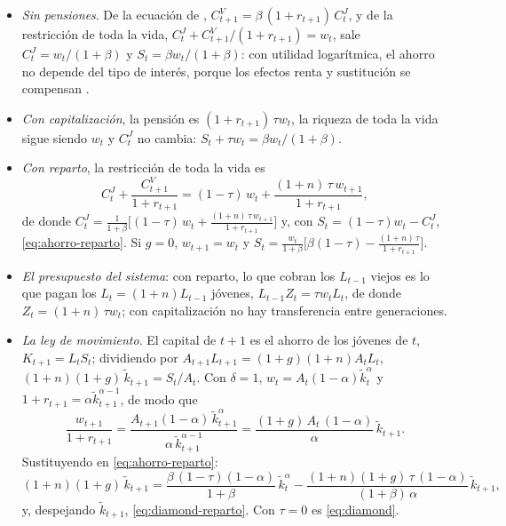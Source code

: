 \documentclass[11pt]{article}
\begin{document}
\begin{itemize}
\item \emph{Sin pensiones}. De la ecuación de , $C^V_{t+1}=\beta\,(1+r_{t+1})\,C^J_t$, y de la restricción de toda la vida, $C^J_t+C^V_{t+1}/(1+r_{t+1})=w_t$, sale $C^J_t=w_t/(1+\beta)$ y $S_t=\beta w_t/(1+\beta)$: con utilidad logarítmica, el ahorro no depende del tipo de interés, porque los efectos renta y sustitución se compensan .
\item \emph{Con capitalización}, la pensión es $(1+r_{t+1})\,\tau w_t$, la riqueza de toda la vida sigue siendo $w_t$ y $C^J_t$ no cambia: $S_t+\tau w_t=\beta w_t/(1+\beta)$.
\item \emph{Con reparto}, la restricción de toda la vida es
  \begin{equation*}
  C^J_t+\frac{C^V_{t+1}}{1+r_{t+1}}=(1-\tau)\,w_t+\frac{(1+n)\,\tau\,w_{t+1}}{1+r_{t+1}},
  \end{equation*}
  de donde $C^J_t=\frac{1}{1+\beta}\Big[(1-\tau)\,w_t+\frac{(1+n)\,\tau\,w_{t+1}}{1+r_{t+1}}\Big]$ y, con $S_t=(1-\tau)w_t-C^J_t$, \eqref{eq:ahorro-reparto}. Si $g=0$, $w_{t+1}=w_t$ y $S_t=\frac{w_t}{1+\beta}\Big[\beta(1-\tau)-\frac{(1+n)\,\tau}{1+r_{t+1}}\Big]$.
\item \emph{El presupuesto del sistema}: con reparto, lo que cobran los $L_{t-1}$ viejos es lo que pagan los $L_t=(1+n)L_{t-1}$ jóvenes, $L_{t-1}Z_t=\tau w_tL_t$, de donde $Z_t=(1+n)\,\tau w_t$; con capitalización no hay transferencia entre generaciones.
\item \emph{La ley de movimiento}. El capital de $t+1$ es el ahorro de los jóvenes de $t$, $K_{t+1}=L_tS_t$; dividiendo por $A_{t+1}L_{t+1}=(1+g)(1+n)A_tL_t$, $(1+n)(1+g)\,\tilde k_{t+1}=S_t/A_t$. Con $\delta=1$, $w_t=A_t(1-\alpha)\tilde k_t^{\alpha}$ y $1+r_{t+1}=\alpha \tilde k_{t+1}^{\alpha-1}$, de modo que
  \begin{equation*}
  \frac{w_{t+1}}{1+r_{t+1}}=\frac{A_{t+1}(1-\alpha)\,\tilde k_{t+1}^{\alpha}}{\alpha\,\tilde k_{t+1}^{\alpha-1}}=\frac{(1+g)\,A_t\,(1-\alpha)}{\alpha}\,\tilde k_{t+1}.
  \end{equation*}
  Sustituyendo en \eqref{eq:ahorro-reparto}:
  \begin{equation*}
  (1+n)(1+g)\,\tilde k_{t+1}=\frac{\beta\,(1-\tau)(1-\alpha)}{1+\beta}\,\tilde k_t^{\alpha}-\frac{(1+n)(1+g)\,\tau\,(1-\alpha)}{(1+\beta)\,\alpha}\,\tilde k_{t+1},
  \end{equation*}
  y, despejando $\tilde k_{t+1}$, \eqref{eq:diamond-reparto}. Con $\tau=0$ es \eqref{eq:diamond}.

\end{itemize}
\end{document}

